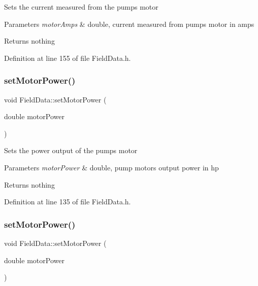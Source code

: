 Sets the current measured from the pump\textquotesingle{}s motor


\begin{DoxyParams}{Parameters}
{\em motor\+Amps} & double, current measured from pump\textquotesingle{}s motor in amps\\
\hline
\end{DoxyParams}
\begin{DoxyReturn}{Returns}
nothing 
\end{DoxyReturn}


Definition at line 155 of file Field\+Data.\+h.

\mbox{\label{class_field_data_a078e6b4899e7046008ccc9de59bd0272}} 
\subsubsection{\texorpdfstring{set\+Motor\+Power()}{setMotorPower()}\hspace{0.1cm}{\footnotesize\ttfamily [1/3]}}
{\footnotesize\ttfamily void Field\+Data\+::set\+Motor\+Power (\begin{DoxyParamCaption}\item[{double}]{motor\+Power }\end{DoxyParamCaption})\hspace{0.3cm}{\ttfamily [inline]}}

Sets the power output of the pump\textquotesingle{}s motor


\begin{DoxyParams}{Parameters}
{\em motor\+Power} & double, pump motor\textquotesingle{}s output power in hp\\
\hline
\end{DoxyParams}
\begin{DoxyReturn}{Returns}
nothing 
\end{DoxyReturn}


Definition at line 135 of file Field\+Data.\+h.

\mbox{\label{class_field_data_a078e6b4899e7046008ccc9de59bd0272}} 
\subsubsection{\texorpdfstring{set\+Motor\+Power()}{setMotorPower()}\hspace{0.1cm}{\footnotesize\ttfamily [2/3]}}
{\footnotesize\ttfamily void Field\+Data\+::set\+Motor\+Power (\begin{DoxyParamCaption}\item[{double}]{motor\+Power }\end{DoxyParamCaption})\hspace{0.3cm}{\ttfamily [inline]}}

